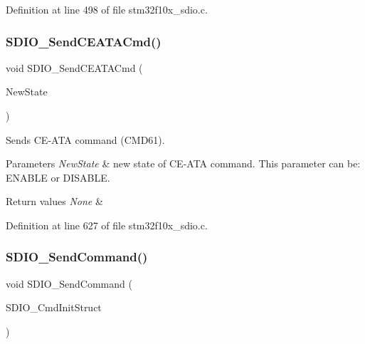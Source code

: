 Definition at line 498 of file stm32f10x\+\_\+sdio.\+c.

\mbox{\label{group___s_d_i_o___private___functions_ga8dc7f17804bdb745b42f6647c8487b4c}} 
\subsubsection{\texorpdfstring{S\+D\+I\+O\+\_\+\+Send\+C\+E\+A\+T\+A\+Cmd()}{SDIO\_SendCEATACmd()}}
{\footnotesize\ttfamily void S\+D\+I\+O\+\_\+\+Send\+C\+E\+A\+T\+A\+Cmd (\begin{DoxyParamCaption}\item[{\hyperlink{group___exported__types_gac9a7e9a35d2513ec15c3b537aaa4fba1}{Functional\+State}}]{New\+State }\end{DoxyParamCaption})}



Sends C\+E-\/\+A\+TA command (C\+M\+D61). 


\begin{DoxyParams}{Parameters}
{\em New\+State} & new state of C\+E-\/\+A\+TA command. This parameter can be\+: E\+N\+A\+B\+LE or D\+I\+S\+A\+B\+LE. \\
\hline
\end{DoxyParams}

\begin{DoxyRetVals}{Return values}
{\em None} & \\
\hline
\end{DoxyRetVals}


Definition at line 627 of file stm32f10x\+\_\+sdio.\+c.

\mbox{\label{group___s_d_i_o___private___functions_ga7117d2f702703f6c0a66bc07707cab23}} 
\subsubsection{\texorpdfstring{S\+D\+I\+O\+\_\+\+Send\+Command()}{SDIO\_SendCommand()}}
{\footnotesize\ttfamily void S\+D\+I\+O\+\_\+\+Send\+Command (\begin{DoxyParamCaption}\item[{\hyperlink{struct_s_d_i_o___cmd_init_type_def}{S\+D\+I\+O\+\_\+\+Cmd\+Init\+Type\+Def} $\ast$}]{S\+D\+I\+O\+\_\+\+Cmd\+Init\+Struct }\end{DoxyParamCaption})}



